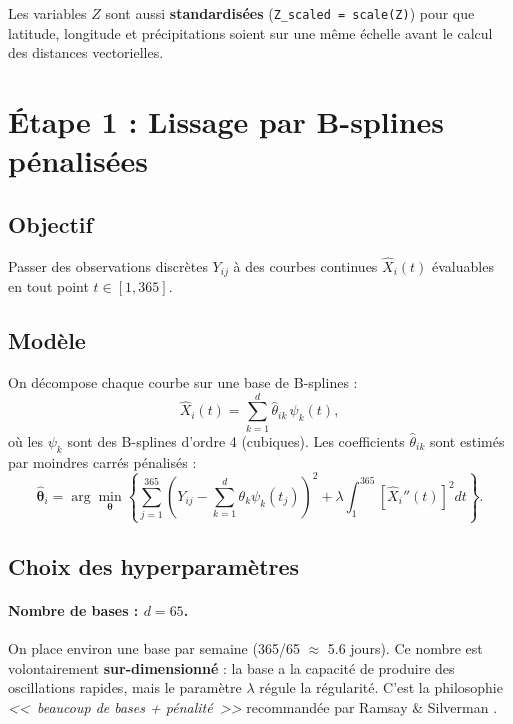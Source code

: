 \documentclass[11pt, a4paper]{article}
\theoremstyle{definition}
\theoremstyle{remark}
\begin{document}
Les variables $Z$ sont aussi \textbf{standardisées} (\texttt{Z\_scaled = scale(Z)})
pour que latitude, longitude et précipitations soient sur une même échelle
avant le calcul des distances vectorielles.

\section{Étape 1 : Lissage par B-splines pénalisées}
\label{sec:lissage}

\subsection{Objectif}

Passer des observations discrètes $Y_{ij}$ à des courbes continues
$\hat{X}_i(t)$ évaluables en tout point $t \in [1, 365]$.

\subsection{Modèle}

On décompose chaque courbe sur une base de B-splines :
\[
  \hat{X}_i(t) = \sum_{k=1}^{d} \hat{\theta}_{ik} \, \psi_k(t),
\]
où les $\psi_k$ sont des B-splines d'ordre 4 (cubiques). Les coefficients
$\hat{\theta}_{ik}$ sont estimés par moindres carrés pénalisés :
\begin{equation}
  \hat{\boldsymbol{\theta}}_i = \arg\min_{\boldsymbol{\theta}}
  \left\{
    \sum_{j=1}^{365} \left( Y_{ij} - \sum_{k=1}^{d} \theta_k \psi_k(t_j) \right)^2
    + \lambda \int_1^{365} \left[ \hat{X}_i''(t) \right]^2 dt
  \right\}.
  \label{eq:lissage}
\end{equation}

\subsection{Choix des hyperparamètres}

\paragraph{Nombre de bases : $d = 65$.}
On place environ une base par semaine (365/65 $\approx$ 5.6 jours). Ce nombre
est volontairement \textbf{sur-dimensionné} : la base a la capacité de produire
des oscillations rapides, mais le paramètre $\lambda$ régule la régularité.
C'est la philosophie \emph{<<~beaucoup de bases + pénalité~>>} recommandée par
Ramsay \& Silverman \cite{ramsay2005}.
\end{document}
